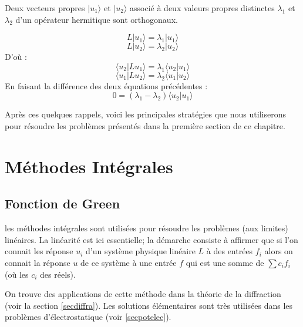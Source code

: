 \documentclass[12pt]{book}
\begin{document}
\begin{thm}
Deux vecteurs propres $|u_1\rangle $ et $|u_2\rangle $ associ\'e \`a deux
valeurs 
propres distinctes $\lambda_1$ et $\lambda_2$ d'un op\'erateur
hermitique sont orthogonaux.
\end{thm}
\begin{pf}
\begin{equation}
L|u_1\rangle =\lambda_1|u_1\rangle 
\end{equation}
\begin{equation}
L|u_2\rangle =\lambda_2|u_2\rangle 
\end{equation}
D'o\`u :
\begin{equation}
 \langle u_2|Lu_1\rangle =\lambda_1 \langle u_2|u_1\rangle 
\end{equation}
\begin{equation}
 \langle u_1|Lu_2\rangle =\lambda_2 \langle u_1|u_2\rangle 
\end{equation}
En faisant la diff\'erence des deux \'equations pr\'ec\'edentes :
\begin{equation}
0=(\lambda_1-\lambda_2) \langle u_2|u_1\rangle 
\end{equation}
\end{pf}

Apr\`es ces quelques rappels, voici les principales strat\'egies que nous
utiliserons pour r\'esoudre les probl\`emes pr\'esent\'es dans la premi\`ere
section de ce chapitre.

\section{M\'ethodes Int\'egrales}\label{chapmethint}
\subsection{Fonction de Green}
les m\'ethodes int\'egrales sont utilis\'ees pour r\'esoudre les probl\`emes
(aux limites) lin\'eaires. La lin\'earit\'e est ici essentielle; la d\'emarche
consiste \`a affirmer que si l'on connait les r\'eponse $u_i$ d'un syst\`eme
physique 
lin\'eaire $L$ \`a des entr\'ees $f_i$ alors on connait la r\'eponse $u$ de ce
syst\`eme \`a une entr\'ee $f$ qui est une somme de $\sum c_i f_i$ (o\`u les
$c_i$ des r\'eels).

On trouve des applications de cette m\'ethode dans la th\'eorie de la
diffraction (voir la section \ref{secdiffra}). Les solutions \'el\'ementaires
sont tr\`es utilis\'ees dans les probl\`emes d'\'electrostatique
(voir \ref{secpotelec}).
 
\end{document}
